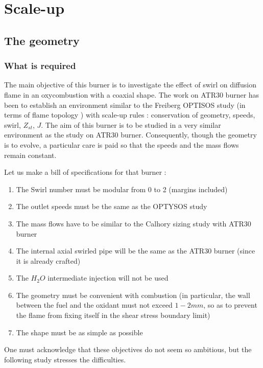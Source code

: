 \renewcommand\evenpagerightmark{{\scshape\small Scale-up}}
\chapter[Scale-up]%
{Scale-up}
\label{Scale-up}

\section{The geometry}
\subsection{What is required}

The main objective of this burner is to investigate the effect of swirl on diffusion flame in an oxycombustion with a coaxial shape. The  work on ATR30 burner has been to establish an environment similar to the Freiberg OPTISOS study (in terms of flame topology ) with scale-up rules : conservation of geometry, speeds, swirl, $Z_{st}$, $J$. The aim of this burner is to be studied in a very similar environment as the study on ATR30 burner. Consequently, though the geometry is to evolve, a particular care is paid so that the speeds and the mass flows remain constant.

Let us make a bill of specifications for that burner :
\begin{enumerate}
\item The Swirl number must be modular from 0 to 2 (margins included)
\item The outlet speeds must be the same as the OPTYSOS study
\item The mass flows have to be similar to the Calhory sizing study with ATR30 burner
\item The internal axial swirled pipe will be the same as the ATR30 burner (since it is already crafted)
\item The $H_{2}O$ intermediate injection will not be used
\item The geometry must be convenient with combustion (in particular, the wall between the fuel and the oxidant must not exceed $1-2mm$, so as to prevent the flame from fixing itself in the shear stress boundary limit)  
\item The shape must be as simple as possible
\end{enumerate}
One must acknowledge that these objectives do not seem so ambitious, but the following study stresses the difficulties.


